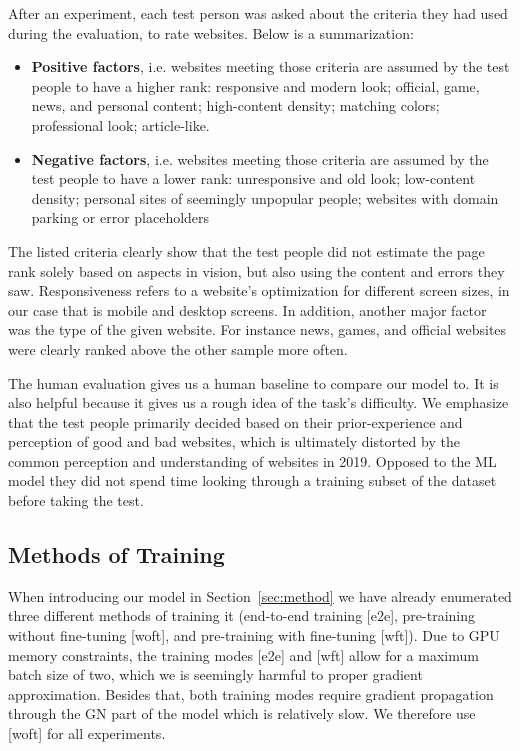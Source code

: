 After an experiment, each test person was asked about the criteria they had used during the evaluation, to rate websites. Below is a summarization:

\begin{itemize}
	\item \textbf{Positive factors}, i.e. websites meeting those criteria are assumed by the test people to have a higher rank: responsive and modern look; official, game, news, and personal content; high-content density; matching colors; professional look; article-like.
	\item \textbf{Negative factors}, i.e. websites meeting those criteria are assumed by the test people to have a lower rank: unresponsive and old look; low-content density; personal sites of seemingly unpopular people; websites with domain parking or error placeholders
\end{itemize}

The listed criteria clearly show that the test people did not estimate the page rank solely based on aspects in vision, but also using the content and errors they saw. Responsiveness refers to a website's optimization for different screen sizes, in our case that is mobile and desktop screens. In addition, another major factor was the type of the given website. For instance news, games, and official websites were clearly ranked above the other sample more often.

The human evaluation gives us a human baseline to compare our model to. It is also helpful because it gives us a rough idea of the task's difficulty. We emphasize that the test people primarily decided based on their prior-experience and perception of good and bad websites, which is ultimately distorted by the common perception and understanding of websites in 2019. Opposed to the ML model they did not spend time looking through a training subset of the dataset before taking the test.

\subsection{Methods of Training}

When introducing our model in Section~\ref{sec:method} we have already enumerated three different methods of training it (end-to-end training [e2e], pre-training without fine-tuning [woft], and pre-training with fine-tuning [wft]). Due to GPU memory constraints, the training modes [e2e] and [wft] allow for a maximum batch size of two, which we is seemingly harmful to proper gradient approximation. Besides that, both training modes require gradient propagation through the GN part of the model which is relatively slow. We therefore use [woft] for all experiments.

